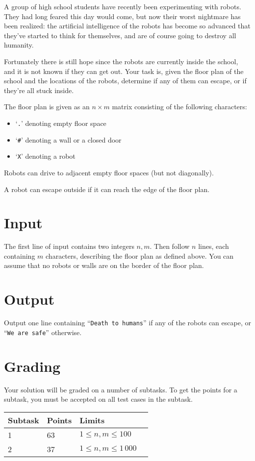 
A group of high school students have recently been experimenting with robots.
They had long feared this day would come, but now their worst nightmare has
been realized: the artificial intelligence of the robots has become so advanced
that they've started to think for themselves, and are of course going to
destroy all humanity.

Fortunately there is still hope since the robots are currently inside the
school, and it is not known if they can get out. Your task is, given the floor
plan of the school and the locations of the robots, determine if any of them
can escape, or if they're all stuck inside.

The floor plan is given as an $n\times m$ matrix consisting of the following characters:

\begin{itemize}
    \item `\texttt{.}' denoting empty floor space
    \item `\texttt{\#}' denoting a wall or a closed door
    \item `\texttt{X}' denoting a robot
\end{itemize}

Robots can drive to adjacent empty floor spaces (but not diagonally).

A robot can escape outside if it can reach the edge of the floor plan.

\section*{Input}
The first line of input contains two integers $n, m$. Then
follow $n$ lines, each containing $m$ characters, describing the floor plan as
defined above. You can assume that no robots or walls are on the border of the
floor plan.

\section*{Output}
Output one line containing ``\texttt{Death to humans}'' if any of the robots
can escape, or ``\texttt{We are safe}'' otherwise.

\section*{Grading}
Your solution will be graded on a number of subtasks. To get the points for a subtask, you must
be accepted on all test cases in the subtask.

\begin{tabular}{| l | l | l | l |}
    \hline
    Subtask & Points & Limits    \\ \hline
    1     & 63         & $1 \le n, m \le 100$ \\ \hline
    2     & 37         & $1 \le n, m \le 1\,000$ \\ \hline
\end{tabular}

